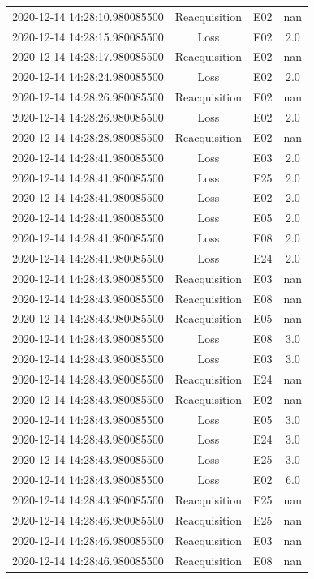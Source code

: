 \begin{enumerate}
\begin{longtabu}{cccc}
2020{-}12{-}14 14:28:10.980085500&Reacquisition&E02&nan\\%
2020{-}12{-}14 14:28:15.980085500&Loss&E02&2.0\\%
2020{-}12{-}14 14:28:17.980085500&Reacquisition&E02&nan\\%
2020{-}12{-}14 14:28:24.980085500&Loss&E02&2.0\\%
2020{-}12{-}14 14:28:26.980085500&Reacquisition&E02&nan\\%
2020{-}12{-}14 14:28:26.980085500&Loss&E02&2.0\\%
2020{-}12{-}14 14:28:28.980085500&Reacquisition&E02&nan\\%
2020{-}12{-}14 14:28:41.980085500&Loss&E03&2.0\\%
2020{-}12{-}14 14:28:41.980085500&Loss&E25&2.0\\%
2020{-}12{-}14 14:28:41.980085500&Loss&E02&2.0\\%
2020{-}12{-}14 14:28:41.980085500&Loss&E05&2.0\\%
2020{-}12{-}14 14:28:41.980085500&Loss&E08&2.0\\%
2020{-}12{-}14 14:28:41.980085500&Loss&E24&2.0\\%
2020{-}12{-}14 14:28:43.980085500&Reacquisition&E03&nan\\%
2020{-}12{-}14 14:28:43.980085500&Reacquisition&E08&nan\\%
2020{-}12{-}14 14:28:43.980085500&Reacquisition&E05&nan\\%
2020{-}12{-}14 14:28:43.980085500&Loss&E08&3.0\\%
2020{-}12{-}14 14:28:43.980085500&Loss&E03&3.0\\%
2020{-}12{-}14 14:28:43.980085500&Reacquisition&E24&nan\\%
2020{-}12{-}14 14:28:43.980085500&Reacquisition&E02&nan\\%
2020{-}12{-}14 14:28:43.980085500&Loss&E05&3.0\\%
2020{-}12{-}14 14:28:43.980085500&Loss&E24&3.0\\%
2020{-}12{-}14 14:28:43.980085500&Loss&E25&3.0\\%
2020{-}12{-}14 14:28:43.980085500&Loss&E02&6.0\\%
2020{-}12{-}14 14:28:43.980085500&Reacquisition&E25&nan\\%
2020{-}12{-}14 14:28:46.980085500&Reacquisition&E25&nan\\%
2020{-}12{-}14 14:28:46.980085500&Reacquisition&E03&nan\\%
2020{-}12{-}14 14:28:46.980085500&Reacquisition&E08&nan\\%

\end{longtabu}
\end{enumerate}
